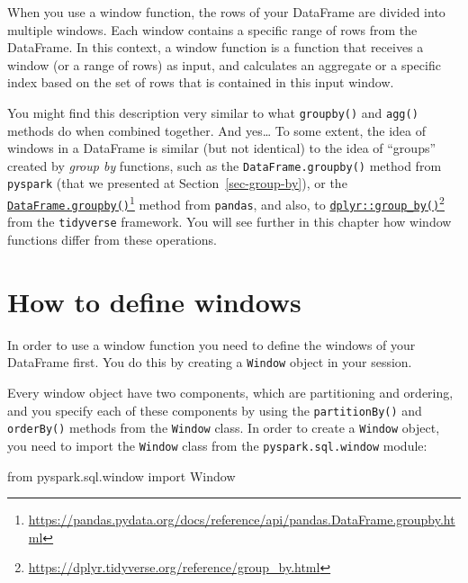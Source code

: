 \documentclass[
  11pt,
  letterpaper,
  DIV=11,
  numbers=noendperiod]{scrreprt}
\newenvironment{Shaded}{\begin{snugshade}}{\end{snugshade}}
\newcommand{\ImportTok}[1]{\textcolor[rgb]{0.00,0.46,0.62}{#1}}
\newcommand{\NormalTok}[1]{\textcolor[rgb]{0.00,0.23,0.31}{#1}}
\begin{document}
When you use a window function, the rows of your DataFrame are divided
into multiple windows. Each window contains a specific range of rows
from the DataFrame. In this context, a window function is a function
that receives a window (or a range of rows) as input, and calculates an
aggregate or a specific index based on the set of rows that is contained
in this input window.

You might find this description very similar to what \texttt{groupby()}
and \texttt{agg()} methods do when combined together. And yes\ldots{} To
some extent, the idea of windows in a DataFrame is similar (but not
identical) to the idea of ``groups'' created by \emph{group by}
functions, such as the \texttt{DataFrame.groupby()} method from
\texttt{pyspark} (that we presented at Section~\ref{sec-group-by}), or
the
\href{https://pandas.pydata.org/docs/reference/api/pandas.DataFrame.groupby.html}{\texttt{DataFrame.groupby()}}\footnote{\url{https://pandas.pydata.org/docs/reference/api/pandas.DataFrame.groupby.html}}
method from \texttt{pandas}, and also, to
\href{https://dplyr.tidyverse.org/reference/group_by.html}{\texttt{dplyr::group\_by()}}\footnote{\url{https://dplyr.tidyverse.org/reference/group_by.html}}
from the \texttt{tidyverse} framework. You will see further in this
chapter how window functions differ from these operations.

\section{How to define windows}\label{sec-window-def}

In order to use a window function you need to define the windows of your
DataFrame first. You do this by creating a \texttt{Window} object in
your session.

Every window object have two components, which are partitioning and
ordering, and you specify each of these components by using the
\texttt{partitionBy()} and \texttt{orderBy()} methods from the
\texttt{Window} class. In order to create a \texttt{Window} object, you
need to import the \texttt{Window} class from the
\texttt{pyspark.sql.window} module:

\begin{Shaded}
\begin{Highlighting}[]
\ImportTok{from}\NormalTok{ pyspark.sql.window }\ImportTok{import}\NormalTok{ Window}
\end{Highlighting}
\end{Shaded}
\end{document}
